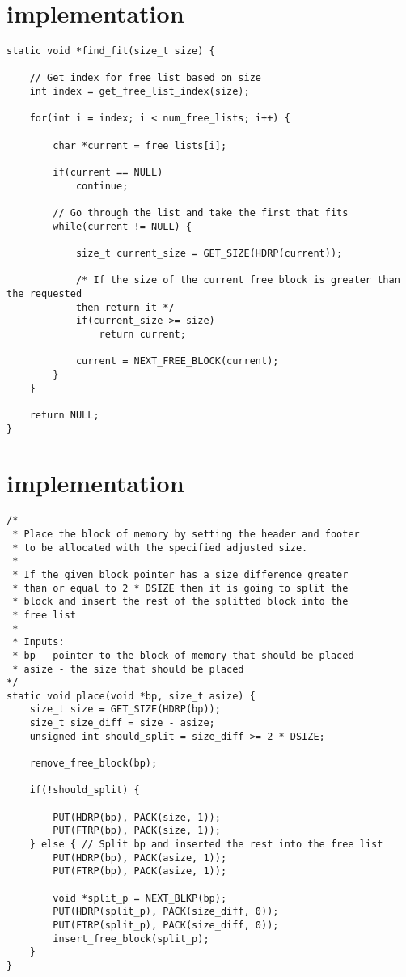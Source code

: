 \section{ implementation} \label{appendix:find_fit}
\begin{lstlisting}
static void *find_fit(size_t size) {

    // Get index for free list based on size
    int index = get_free_list_index(size); 

    for(int i = index; i < num_free_lists; i++) {

        char *current = free_lists[i];

        if(current == NULL)
            continue;

        // Go through the list and take the first that fits
        while(current != NULL) {

            size_t current_size = GET_SIZE(HDRP(current)); 

            /* If the size of the current free block is greater than the requested
            then return it */ 
            if(current_size >= size)
                return current;
                
            current = NEXT_FREE_BLOCK(current);    
        }
    }

    return NULL;
}
\end{lstlisting}

\section{ implementation} \label{appendix:place}

\begin{lstlisting}
/*
 * Place the block of memory by setting the header and footer
 * to be allocated with the specified adjusted size.
 * 
 * If the given block pointer has a size difference greater 
 * than or equal to 2 * DSIZE then it is going to split the
 * block and insert the rest of the splitted block into the 
 * free list
 * 
 * Inputs:
 * bp - pointer to the block of memory that should be placed
 * asize - the size that should be placed
*/
static void place(void *bp, size_t asize) {
    size_t size = GET_SIZE(HDRP(bp));
    size_t size_diff = size - asize;
    unsigned int should_split = size_diff >= 2 * DSIZE;
    
    remove_free_block(bp);

    if(!should_split) {

        PUT(HDRP(bp), PACK(size, 1));
        PUT(FTRP(bp), PACK(size, 1)); 
    } else { // Split bp and inserted the rest into the free list
        PUT(HDRP(bp), PACK(asize, 1));
        PUT(FTRP(bp), PACK(asize, 1));

        void *split_p = NEXT_BLKP(bp);
        PUT(HDRP(split_p), PACK(size_diff, 0));
        PUT(FTRP(split_p), PACK(size_diff, 0));
        insert_free_block(split_p);
    }
}

\end{lstlisting}